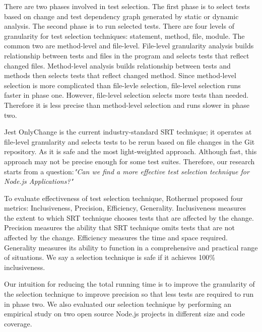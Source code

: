 \documentclass[10pt, conference]{IEEEtran}
\begin{document}
There are two phases involved in test selection. The first phase is to select tests based on change and 
test dependency graph generated by static or dynamic analysis. The second phase is to run selected tests.
There are four levels of granularity for test selection techniques: statement, method, file, module. The common 
two are method-level and file-level. File-level granularity analysis builds relationship between tests and files in 
the program and selects tests that reflect changed files. Method-level analysis builds relationship between tests and methods 
then selects tests that reflect changed method. Since method-level selection is more complicated than  
file-levle selection, file-level selection runs faster in phase one. However, file-level selection selects more 
tests than needed. Therefore it is less precise than method-level selection and runs slower in phase two. 

Jest OnlyChange is the current industry-standard SRT technique; it operates at file-level granularity and selects 
tests to be rerun based on file changes in the Git repository. As it is safe and the most light-weighted approach. Although fast, this approach may not be precise 
enough for some test suites. Therefore, our research starts from a question:\textit{"Can we find a more 
effective test selection technique for Node.js Applications?"} 

To evaluate effectiveness of test selection technique, Rothermel\cite{b13} proposed four metrics: Inclusiveness, Precision, Efficiency, Generality. Inclusiveness 
measures the extent to which SRT technique chooses tests that are affected by the change. Precision measures 
the ability that SRT technique omits tests that are not affected by the change. Efficiency measures the time and 
space required. Generality measures its ability to function in a comprehensive and practical range of situations.
We say a selection technique is safe if it achieves 100\% inclusiveness.

Our intuition for reducing the total running time is to 
improve the granularity of the selection technique to improve precision so that less tests are required to run in phase two. 
We also evaluated our selection technique by performing an empirical study on two open source Node.js projects in different 
size and code coverage.
\end{document}
